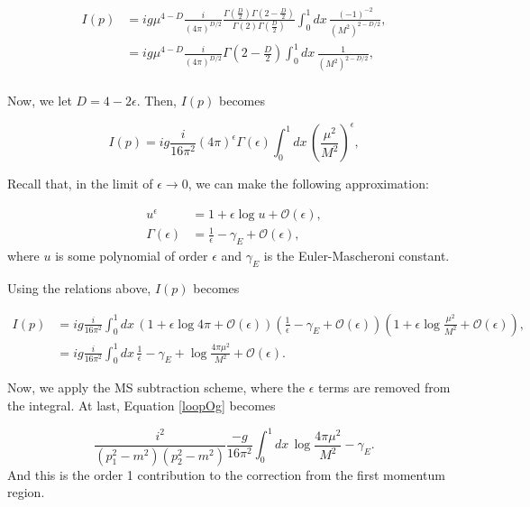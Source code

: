 \documentclass{scrartcl}
\begin{document}
\begin{equation}
    \begin{split}
        I(p) &= ig\mu^{4-D} \frac{i}{(4\pi)^{D/2}}\frac{\Gamma(\frac{D}{2})\Gamma(2-\frac{D}{2})}{\Gamma(2)\Gamma(\frac{D}{2})}\int^1_0 dx \, \frac{(-1)^{-2}}{(M^2)^{2-D/2}},\\
        &= ig\mu^{4-D} \frac{i}{(4\pi)^{D/2}}\Gamma(2-\frac{D}{2})\int^1_0 dx \, \frac{1}{(M^2)^{2-D/2}},\\
    \end{split}
\end{equation}

Now, we let $D=4-2\epsilon$. Then, $I(p)$ becomes

\begin{equation}
    I(p)=ig\frac{i}{16\pi^2}(4\pi)^{\epsilon}\Gamma(\epsilon)\int^1_0 dx \, \left(\frac{\mu^2}{M^2}\right)^{\epsilon},
\end{equation}

Recall that, in the limit of $\epsilon\rightarrow 0$, we can make the following approximation:

\begin{equation}
\begin{split}
    u^\epsilon &= 1 + \epsilon \log{u} + \mathcal{O}(\epsilon),\\
    \Gamma(\epsilon) &= \frac{1}{\epsilon} - \gamma_E + \mathcal{O}(\epsilon),
\end{split}
\end{equation}
where $u$ is some polynomial of order $\epsilon$ and $\gamma_E$ is the Euler-Mascheroni constant.

Using the relations above, $I(p)$ becomes

\begin{equation}
    \begin{split}
       I(p)&=ig\frac{i}{16\pi^2}\int^1_0 dx \, (1+\epsilon\log{4\pi} + \mathcal{O}(\epsilon))(\frac{1}{\epsilon} - \gamma_E + \mathcal{O}(\epsilon))(1+\epsilon\log{\frac{\mu^2}{M^2}}+ \mathcal{O}(\epsilon)),\\
       &=ig\frac{i}{16\pi^2}\int^1_0 dx \, \frac{1}{\epsilon} - \gamma_E + \log{\frac{4\pi\mu^2}{M^2}} + \mathcal{O}(\epsilon).
    \end{split}
\end{equation}

Now, we apply the MS subtraction scheme, where the $\epsilon$ terms are removed from the integral. At last, Equation \ref{loopOg} becomes 

\begin{equation}
     \frac{i^2}{(p_1^2-m^2)(p_2^2-m^2)}\frac{-g}{16\pi^2}\int^1_0 dx \, \log{\frac{4\pi\mu^2}{M^2}} - \gamma_E.
\end{equation}
And this is the order 1 contribution to the correction from the first momentum region.
\end{document}

